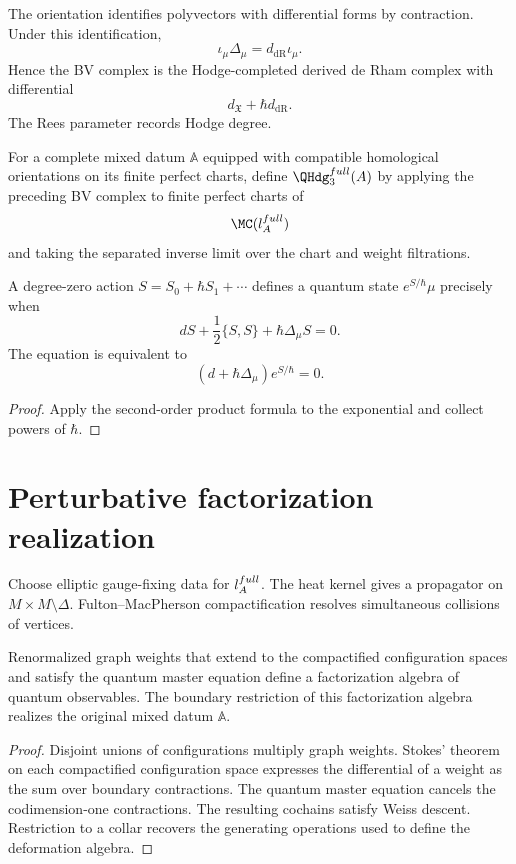 The orientation identifies polyvectors with differential forms by contraction.  Under this identification,
\[
 \iota_\mu\Delta_\mu=d_{\mathrm{dR}}\iota_\mu.
\]
Hence the BV complex is the Hodge-completed derived de Rham complex with differential
\[
 d_{\mathfrak X}+\hbar d_{\mathrm{dR}}.
\]
The Rees parameter records Hodge degree.

\begin{definition}
For a complete mixed datum $\mathbb A$ equipped with compatible homological orientations on its finite perfect charts, define $\QHdg_3^{\mathrm{full}}(\mathbb A)$ by applying the preceding BV complex to finite perfect charts of
\[
 \MC(\flie_{\mathbb A}^{\mathrm{full}})
\]
and taking the separated inverse limit over the chart and weight filtrations.
\end{definition}

\begin{theorem}
A degree-zero action $S=S_0+\hbar S_1+\cdots$ defines a quantum state $e^{S/\hbar}\mu$ precisely when
\[
 dS+\frac12\{S,S\}+\hbar\Delta_\mu S=0.
\]
The equation is equivalent to
\[
 (d+\hbar\Delta_\mu)e^{S/\hbar}=0.
\]
\end{theorem}
\begin{proof}
Apply the second-order product formula to the exponential and collect powers of $\hbar$.
\end{proof}

\chapter{Perturbative factorization realization}
Choose elliptic gauge-fixing data for $l_{A}^{full}$.  The heat kernel gives a propagator on $M\times M\setminus\Delta$.  Fulton--MacPherson compactification resolves simultaneous collisions of vertices.

\begin{theorem}
Renormalized graph weights that extend to the compactified configuration spaces and satisfy the quantum master equation define a factorization algebra of quantum observables.  The boundary restriction of this factorization algebra realizes the original mixed datum $\mathbb A$.
\end{theorem}
\begin{proof}
Disjoint unions of configurations multiply graph weights.  Stokes' theorem on each compactified configuration space expresses the differential of a weight as the sum over boundary contractions.  The quantum master equation cancels the codimension-one contractions.  The resulting cochains satisfy Weiss descent.  Restriction to a collar recovers the generating operations used to define the deformation algebra.
\end{proof}

